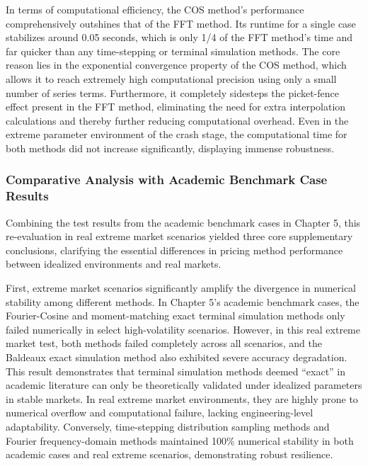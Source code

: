 In terms of computational efficiency, the COS method's performance comprehensively outshines that of the FFT method. Its runtime for a single case stabilizes around 0.05 seconds, which is only 1/4 of the FFT method's time and far quicker than any time-stepping or terminal simulation methods. The core reason lies in the exponential convergence property of the COS method, which allows it to reach extremely high computational precision using only a small number of series terms. Furthermore, it completely sidesteps the picket-fence effect present in the FFT method, eliminating the need for extra interpolation calculations and thereby further reducing computational overhead. Even in the extreme parameter environment of the crash stage, the computational time for both methods did not increase significantly, displaying immense robustness.

\subsubsection{Comparative Analysis with Academic Benchmark Case Results}
Combining the test results from the academic benchmark cases in Chapter 5, this re-evaluation in real extreme market scenarios yielded three core supplementary conclusions, clarifying the essential differences in pricing method performance between idealized environments and real markets.

First, extreme market scenarios significantly amplify the divergence in numerical stability among different methods. In Chapter 5's academic benchmark cases, the Fourier-Cosine and moment-matching exact terminal simulation methods only failed numerically in select high-volatility scenarios. However, in this real extreme market test, both methods failed completely across all scenarios, and the Baldeaux exact simulation method also exhibited severe accuracy degradation. This result demonstrates that terminal simulation methods deemed ``exact'' in academic literature can only be theoretically validated under idealized parameters in stable markets. In real extreme market environments, they are highly prone to numerical overflow and computational failure, lacking engineering-level adaptability. Conversely, time-stepping distribution sampling methods and Fourier frequency-domain methods maintained 100\% numerical stability in both academic cases and real extreme scenarios, demonstrating robust resilience.

